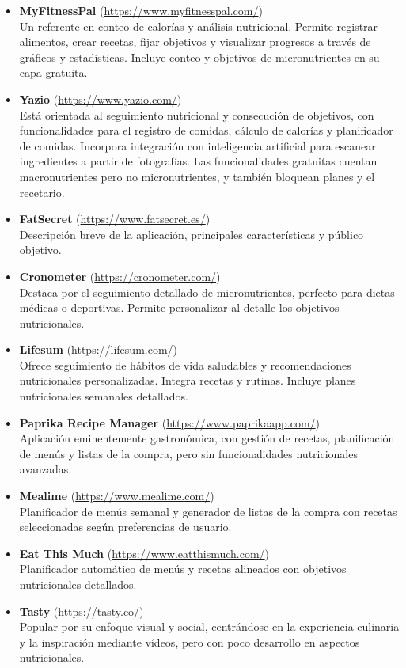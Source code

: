 \begin{itemize}
  \item \textbf{MyFitnessPal} (\url{https://www.myfitnesspal.com/})\\
  Un referente en conteo de calorías y análisis nutricional. Permite registrar alimentos, crear recetas, fijar objetivos y visualizar progresos a través de gráficos y estadísticas. Incluye conteo y objetivos de micronutrientes en su capa gratuita.

  \item \textbf{Yazio} (\url{https://www.yazio.com/})\\
  Está orientada al seguimiento nutricional y consecución de objetivos, con funcionalidades para el registro de comidas, cálculo de calorías y planificador de comidas. Incorpora integración con inteligencia artificial para escanear ingredientes a partir de fotografías. Las funcionalidades gratuitas cuentan macronutrientes pero no micronutrientes, y también bloquean planes y el recetario.

  \item \textbf{FatSecret} (\url{https://www.fatsecret.es/})\\
  Descripción breve de la aplicación, principales características y público objetivo.

  \item \textbf{Cronometer} (\url{https://cronometer.com/})\\
  Destaca por el seguimiento detallado de micronutrientes, perfecto para dietas médicas o deportivas. Permite personalizar al detalle los objetivos nutricionales.

  \item \textbf{Lifesum} (\url{https://lifesum.com/})\\
  Ofrece seguimiento de hábitos de vida saludables y recomendaciones nutricionales personalizadas. Integra recetas y rutinas. Incluye planes nutricionales semanales detallados.

  \item \textbf{Paprika Recipe Manager} (\url{https://www.paprikaapp.com/})\\
  Aplicación eminentemente gastronómica, con gestión de recetas, planificación de menús y listas de la compra, pero sin funcionalidades nutricionales avanzadas.

  \item \textbf{Mealime} (\url{https://www.mealime.com/})\\
  Planificador de menús semanal y generador de listas de la compra con recetas seleccionadas según preferencias de usuario.

  \item \textbf{Eat This Much} (\url{https://www.eatthismuch.com/})\\
  Planificador automático de menús y recetas alineados con objetivos nutricionales detallados.

  \item \textbf{Tasty} (\url{https://tasty.co/})\\
  Popular por su enfoque visual y social, centrándose en la experiencia culinaria y la inspiración mediante vídeos, pero con poco desarrollo en aspectos nutricionales.
\end{itemize}


